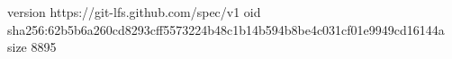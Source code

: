 version https://git-lfs.github.com/spec/v1
oid sha256:62b5b6a260cd8293cff5573224b48c1b14b594b8be4c031cf01e9949cd16144a
size 8895
